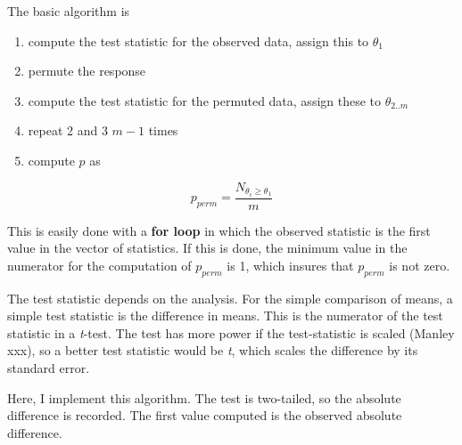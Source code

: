 \documentclass[]{book}
\providecommand{\tightlist}{%
  \setlength{\itemsep}{0pt}\setlength{\parskip}{0pt}}
\begin{document}
The basic algorithm is

\begin{enumerate}
\def\labelenumi{\arabic{enumi}.}
\tightlist
\item
  compute the test statistic for the observed data, assign this to
  \(\theta_1\)
\item
  permute the response
\item
  compute the test statistic for the permuted data, assign these to
  \(\theta_{2..m}\)
\item
  repeat 2 and 3 \(m-1\) times
\item
  compute \(p\) as
\end{enumerate}

\begin{equation}
p_{perm} = \frac{N_{\theta_i \ge \theta_{1}}}{m}
\end{equation}

This is easily done with a \textbf{for loop} in which the observed
statistic is the first value in the vector of statistics. If this is
done, the minimum value in the numerator for the computation of
\(p_{perm}\) is 1, which insures that \(p_{perm}\) is not zero.

The test statistic depends on the analysis. For the simple comparison of
means, a simple test statistic is the difference in means. This is the
numerator of the test statistic in a \emph{t}-test. The test has more
power if the test-statistic is scaled (Manley xxx), so a better test
statistic would be \emph{t}, which scales the difference by its standard
error.

Here, I implement this algorithm. The test is two-tailed, so the
absolute difference is recorded. The first value computed is the
observed absolute difference.
\end{document}
